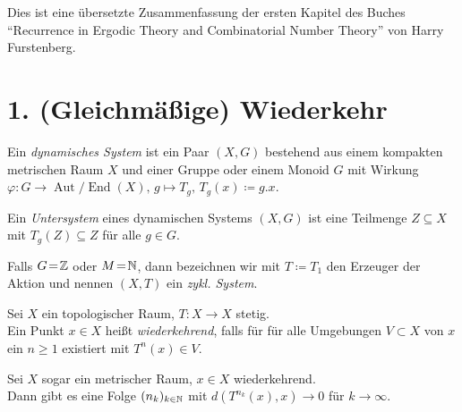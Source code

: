 \documentclass{cheat-sheet}
\DeclareMathOperator{\Aut}{Aut} %
\DeclareMathOperator{\End}{End} %
\newcommand{\AutEnd}{\Aut\!/\!\End} %
\begin{document}


Dies ist eine übersetzte Zusammenfassung der ersten Kapitel des Buches "`Recurrence in Ergodic Theory and Combinatorial Number Theory"' von Harry Furstenberg.

\section{1. (Gleichmäßige) Wiederkehr}


\begin{defn}
  Ein \emph{dynamisches System} ist ein Paar $(X, G)$ bestehend aus einem kompakten metrischen Raum $X$ und einer Gruppe oder einem Monoid $G$ mit Wirkung
  $\varphi : G \to \AutEnd(X), \, g \mapsto T_g, \, T_g(x) \coloneqq g.x$.
\end{defn}

\begin{defn}
  Ein \emph{Untersystem} eines dynamischen Systems $(X, G)$ ist eine Teilmenge $Z \subseteq X$ mit $T_g(Z) \subseteq Z$ für alle $g \in G$.
\end{defn}

\begin{bem}
  Falls $G \!=\! \mathbb{Z}$ oder $M \!=\! \mathbb{N}$, dann bezeichnen wir mit $T \coloneqq T_1$ den Erzeuger der Aktion und nennen $(X, T)$ ein \emph{zykl. System}.
\end{bem}

\begin{defn}
  Sei $X$ ein topologischer Raum, $T : X \to X$ stetig. \\
  Ein Punkt $x \in X$ heißt \emph{wiederkehrend}, falls für für alle Umgebungen $V \subset X$ von $x$ ein $n \geq 1$ existiert mit $T^n(x) \in V$.
\end{defn}

\begin{bem}
  Sei $X$ sogar ein metrischer Raum, $x \in X$ wiederkehrend. \\
  Dann gibt es eine Folge $(n_k)_{k \in \mathbb{N}}$ mit $d(T^{n_k}(x), x) \to 0$ für $k \to \infty$.
\end{bem}
\end{document}
